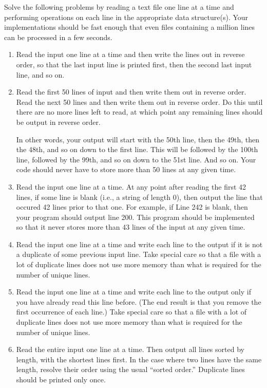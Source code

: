 {{{{{{{{{\begin{exc}
  Solve the following problems by reading a text file one line at a time and performing operations on each line in the appropriate data structure(s).  Your implementations should be fast enough that even files containing a million lines can be processed in a few seconds.
  \begin{enumerate}
    \item Read the input one line at a time and then write the lines out in reverse order, so that the last input line is printed first, then the second last input line, and so on.

    \item  Read the first 50 lines of input and then write them out in reverse order. Read the next 50 lines and then write them out in reverse order. Do this until there are no more lines left to read, at which point any remaining lines should be output in reverse order.

      In other words, your output will start with the 50th line, then the 49th, then the 48th, and so on down to the first line. This will be followed by the 100th line, followed by the 99th, and so on down to the 51st line. And so on.  Your code should never have to store more than 50 lines at any given time.

    \item Read the input one line at a time.  At any point after reading the first 42 lines, if some line is blank (i.e., a string of length 0), then output the line that occured 42 lines prior to that one. For example, if Line 242 is blank, then your program should output line 200. This program should be implemented so that it never stores more than 43 lines of the input at any given time.

    \item Read the input one line at a time and write each line to the output if it is not a duplicate of some previous input line. Take special care so that a file with a lot of duplicate lines does not use more memory than what is required for the number of unique lines.

    \item Read the input one line at a time and write each line to the output only if you have already read this line before. (The end result is that you remove the first occurrence of each line.) Take special care so that a file with a lot of duplicate lines does not use more memory than what is required for the number of unique lines.

    \item Read the entire input one line at a time. Then output all lines sorted by length, with the shortest lines first. In the case where two lines have the same length, resolve their order using the usual ``sorted order.''  Duplicate lines should be printed only once.


\end{enumerate}
\end{exc}}}}}}}}}}
